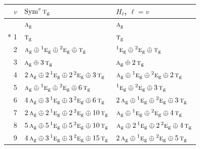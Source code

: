 \documentclass[10pt,a4paper]{article}
\numberwithin{equation}{section}
\newcommand{\irr}[1]{\text{\normalfont\scshape #1}}
\newcommand{\conjpair}[1]{{}^{#1}}
\newcommand{\ptag}[1]{\mathrm{#1}}
\begin{document}
{\small\begin{longtable}{@{}rll@{}}\toprule
$v$ & $\operatorname{Sym}^{v}\irr{t}_{\ptag{g}}$ & $H_\ell$, $\ell = v$\\\midrule\endhead
\bottomrule\endfoot\endlastfoot
0 & $\irr{a}_{\ptag{g}}$ & $\irr{a}_{\ptag{g}}$\\*
1 & $\irr{t}_{\ptag{g}}$ & $\irr{t}_{\ptag{g}}$\\
2 & $\irr{a}_{\ptag{g}} \oplus \conjpair{1}\irr{e}_{\ptag{g}} \oplus \conjpair{2}\irr{e}_{\ptag{g}} \oplus \irr{t}_{\ptag{g}}$ & $\conjpair{1}\irr{e}_{\ptag{g}} \oplus \conjpair{2}\irr{e}_{\ptag{g}} \oplus \irr{t}_{\ptag{g}}$\\
3 & $\irr{a}_{\ptag{g}} \oplus 3\,\irr{t}_{\ptag{g}}$ & $\irr{a}_{\ptag{g}} \oplus 2\,\irr{t}_{\ptag{g}}$\\
4 & $2\,\irr{a}_{\ptag{g}} \oplus 2\,\conjpair{1}\irr{e}_{\ptag{g}} \oplus 2\,\conjpair{2}\irr{e}_{\ptag{g}} \oplus 3\,\irr{t}_{\ptag{g}}$ & $\irr{a}_{\ptag{g}} \oplus \conjpair{1}\irr{e}_{\ptag{g}} \oplus \conjpair{2}\irr{e}_{\ptag{g}} \oplus 2\,\irr{t}_{\ptag{g}}$\\
5 & $\irr{a}_{\ptag{g}} \oplus \conjpair{1}\irr{e}_{\ptag{g}} \oplus \conjpair{2}\irr{e}_{\ptag{g}} \oplus 6\,\irr{t}_{\ptag{g}}$ & $\conjpair{1}\irr{e}_{\ptag{g}} \oplus \conjpair{2}\irr{e}_{\ptag{g}} \oplus 3\,\irr{t}_{\ptag{g}}$\\
6 & $4\,\irr{a}_{\ptag{g}} \oplus 3\,\conjpair{1}\irr{e}_{\ptag{g}} \oplus 3\,\conjpair{2}\irr{e}_{\ptag{g}} \oplus 6\,\irr{t}_{\ptag{g}}$ & $2\,\irr{a}_{\ptag{g}} \oplus \conjpair{1}\irr{e}_{\ptag{g}} \oplus \conjpair{2}\irr{e}_{\ptag{g}} \oplus 3\,\irr{t}_{\ptag{g}}$\\
7 & $2\,\irr{a}_{\ptag{g}} \oplus 2\,\conjpair{1}\irr{e}_{\ptag{g}} \oplus 2\,\conjpair{2}\irr{e}_{\ptag{g}} \oplus 10\,\irr{t}_{\ptag{g}}$ & $\irr{a}_{\ptag{g}} \oplus \conjpair{1}\irr{e}_{\ptag{g}} \oplus \conjpair{2}\irr{e}_{\ptag{g}} \oplus 4\,\irr{t}_{\ptag{g}}$\\
8 & $5\,\irr{a}_{\ptag{g}} \oplus 5\,\conjpair{1}\irr{e}_{\ptag{g}} \oplus 5\,\conjpair{2}\irr{e}_{\ptag{g}} \oplus 10\,\irr{t}_{\ptag{g}}$ & $\irr{a}_{\ptag{g}} \oplus 2\,\conjpair{1}\irr{e}_{\ptag{g}} \oplus 2\,\conjpair{2}\irr{e}_{\ptag{g}} \oplus 4\,\irr{t}_{\ptag{g}}$\\
9 & $4\,\irr{a}_{\ptag{g}} \oplus 3\,\conjpair{1}\irr{e}_{\ptag{g}} \oplus 3\,\conjpair{2}\irr{e}_{\ptag{g}} \oplus 15\,\irr{t}_{\ptag{g}}$ & $2\,\irr{a}_{\ptag{g}} \oplus \conjpair{1}\irr{e}_{\ptag{g}} \oplus \conjpair{2}\irr{e}_{\ptag{g}} \oplus 5\,\irr{t}_{\ptag{g}}$\\

\end{longtable}}
\end{document}
